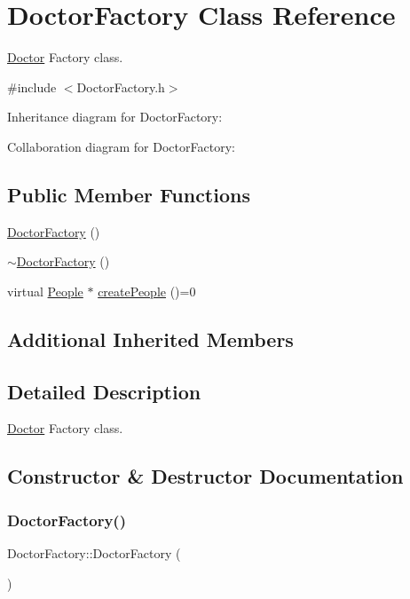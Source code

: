 \hypertarget{classDoctorFactory}{}\section{Doctor\+Factory Class Reference}
\label{classDoctorFactory}


\hyperlink{classDoctor}{Doctor} Factory class.  




{\ttfamily \#include $<$Doctor\+Factory.\+h$>$}



Inheritance diagram for Doctor\+Factory\+:


Collaboration diagram for Doctor\+Factory\+:
\subsection*{Public Member Functions}
\begin{DoxyCompactItemize}
\item 
\hyperlink{classDoctorFactory_aadc371102a234a3a86f46e029f6cf6fe}{Doctor\+Factory} ()
\item 
\hyperlink{classDoctorFactory_a3f2ed2a1a4378d3490c0412645f70767}{$\sim$\+Doctor\+Factory} ()
\item 
virtual \hyperlink{classPeople}{People} $\ast$ \hyperlink{classDoctorFactory_a2fead4ec5680093ba93fde6b1b734c59}{create\+People} ()=0
\end{DoxyCompactItemize}
\subsection*{Additional Inherited Members}


\subsection{Detailed Description}
\hyperlink{classDoctor}{Doctor} Factory class. 

\subsection{Constructor \& Destructor Documentation}
\mbox{\label{classDoctorFactory_aadc371102a234a3a86f46e029f6cf6fe}} 
\subsubsection{\texorpdfstring{Doctor\+Factory()}{DoctorFactory()}}
{\footnotesize\ttfamily Doctor\+Factory\+::\+Doctor\+Factory (\begin{DoxyParamCaption}{ }\end{DoxyParamCaption})}

